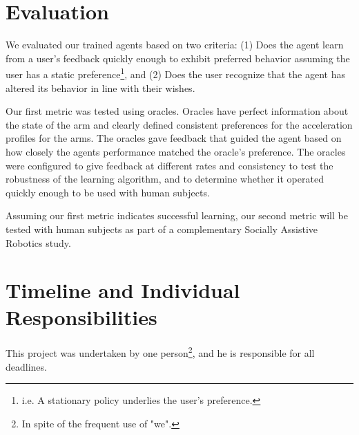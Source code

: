 \documentclass{article}
\begin{document}
\section{Evaluation}


We evaluated our trained agents based on two criteria: (1) Does the agent learn from a user's feedback quickly enough to exhibit preferred behavior assuming the user has a static preference\footnote{i.e. A stationary policy underlies the user's preference.}, and (2)  Does the user recognize that the agent has altered its behavior in line with their wishes. 

Our first metric was tested using oracles. Oracles have perfect information about the state of the arm and clearly defined consistent preferences for the acceleration profiles for the arms. The oracles gave feedback that guided the agent based on how closely the agents performance matched the oracle's preference. The oracles were configured to give feedback at different rates and consistency to test the robustness of the learning algorithm, and to determine whether it operated quickly enough to be used with human subjects.

Assuming our first metric indicates successful learning, our second metric will be tested with human subjects as part of a complementary Socially Assistive Robotics study. 





\section{Timeline and Individual Responsibilities}

This project was undertaken by one person\footnote{In spite of the frequent use of "we".}, and he is responsible for all deadlines. 
\end{document}
